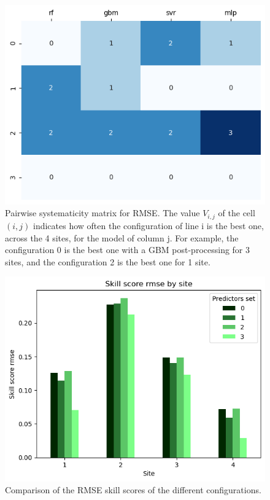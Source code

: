 \begin{figure}[htb!]
    \centering
    \includegraphics[width=\columnwidth]{figures/first_study/comp_predictors_rmse.png}
\caption{Pairwise systematicity matrix for RMSE. The value $V_{i,j}$ of
 the cell $(i,j)$ indicates how often the configuration of line i is the best one, across 
 the 4 sites, for the model of column j. For example, the configuration 0 is the best one
 with a GBM post-processing for 3 sites, and the configuration 2 is the best one for 1 site.}
\end{figure}

\begin{figure}[htb!]
    \centering
    \includegraphics[width=\columnwidth]{figures/first_study/comp_predictors_rmse_mlp.png}
\caption{Comparison of the RMSE skill scores of the different configurations.}
\end{figure}